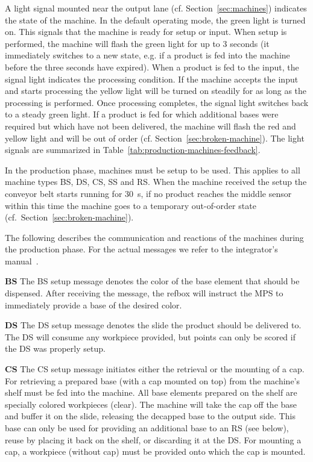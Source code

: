 \documentclass[12pt,twoside]{article}
\newcommand{\refsec}[1]{Section~\ref{#1}}
\newcommand{\reftab}[1]{Table~\ref{#1}}
\begin{document}
A light signal mounted near the output lane
(cf. \refsec{sec:machines}) indicates the state of the machine. In the
default operating mode, the green light is turned on. This signals
that the machine is ready for setup or input. When setup is performed,
the machine will flash the green light for up to 3 seconds (it
immediately switches to a new state, e.g. if a product is fed into the
machine before the three seconds have expired). When a product is fed
to the input, the signal light indicates the processing condition. If
the machine accepts the input and starts processing the yellow light
will be turned on steadily for as long as the processing is
performed. Once processing completes, the signal light switches back to a
steady green light. If a product is fed for which additional bases
were required but which have not been delivered, the machine will
flash the red and yellow light and will be out of order
(cf. \refsec{sec:broken-machine}). The light signals are summarized in
\reftab{tab:production-machines-feedback}.

In the production phase, machines must be setup to be used. This
applies to all machine types BS, DS, CS, SS and RS.  When the machine
received the setup the conveyor belt starts running for
\SI{30}{\second}, if no product reaches the middle sensor within this
time the machine goes to a temporary out-of-order state
(cf.~\refsec{sec:broken-machine}).

The following describes the communication and reactions of the
machines during the production phase. For the actual messages we refer
to the integrator's manual~\cite{RefBoxIntManual}.

\smallskip

\noindent\textbf{BS}
The BS setup message denotes the color of the base element that should
be dispensed. After receiving the message, the refbox will instruct
the MPS to immediately provide a base of the desired color.

\noindent\textbf{DS}
The DS setup message denotes the slide the product should be delivered
to. The DS will consume any workpiece provided, but points can only be
scored if the DS was properly setup.

\noindent\textbf{CS}
The CS setup message initiates either the retrieval or the mounting of
a cap. For retrieving a prepared base (with a cap mounted on top) from
the machine's shelf must be fed into the machine. All base elements
prepared on the shelf are specially colored workpieces (clear). The
machine will take the cap off the base and buffer it on the slide,
releasing the decapped base to the output side. This base can only be
used for providing an additional base to an RS (see below), reuse by
placing it back on the shelf, or discarding it at the DS.  For
mounting a cap, a workpiece (without cap) must be provided onto which
the cap is mounted.
\end{document}

